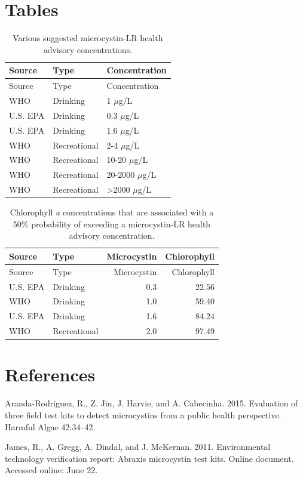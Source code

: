 \documentclass[11pt,]{article}
\begin{document}
\newpage

\section{Tables}\label{tables}

\begin{longtable}[c]{@{}lll@{}}
\caption{Various suggested microcystin-LR health advisory
concentrations. \label{tab:microcystin_levels}}\tabularnewline
\toprule
Source & Type & Concentration\tabularnewline
\midrule
\endfirsthead
\toprule
Source & Type & Concentration\tabularnewline
\midrule
\endhead
WHO & Drinking & 1 \(\mu\)g/L\tabularnewline
U.S. EPA & Drinking & 0.3 \(\mu\)g/L\tabularnewline
U.S. EPA & Drinking & 1.6 \(\mu\)g/L\tabularnewline
WHO & Recreational & 2-4 \(\mu\)g/L\tabularnewline
WHO & Recreational & 10-20 \(\mu\)g/L\tabularnewline
WHO & Recreational & 20-2000 \(\mu\)g/L\tabularnewline
WHO & Recreational & \textgreater{}2000 \(\mu\)g/L\tabularnewline
\bottomrule
\end{longtable}

\newpage

\begin{longtable}[c]{@{}llrr@{}}
\caption{Chlorophyll \textit{a} concentrations that are associated with
a 50\% probability of exceeding a microcystin-LR health advisory
concentration. \label{tab:mc_chla_table}}\tabularnewline
\toprule
Source & Type & Microcystin & Chlorophyll\tabularnewline
\midrule
\endfirsthead
\toprule
Source & Type & Microcystin & Chlorophyll\tabularnewline
\midrule
\endhead
U.S. EPA & Drinking & 0.3 & 22.56\tabularnewline
WHO & Drinking & 1.0 & 59.40\tabularnewline
U.S. EPA & Drinking & 1.6 & 84.24\tabularnewline
WHO & Recreational & 2.0 & 97.49\tabularnewline
\bottomrule
\end{longtable}

\newpage

\section*{References}\label{references}

Aranda-Rodriguez, R., Z. Jin, J. Harvie, and A. Cabecinha. 2015.
Evaluation of three field test kits to detect microcystins from a public
health perspective. Harmful Algae 42:34--42.

James, R., A. Gregg, A. Dindal, and J. McKernan. 2011. Environmental
technology verification report: Abraxis microcystin test kits. Online
document. Accessed online: June 22.
\end{document}
